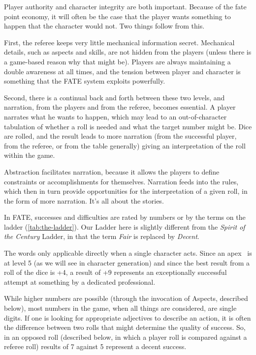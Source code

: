 Player authority and character integrity are both important. Because of the fate point economy, it will often be the case that the player wants something to happen that the character would not. Two things follow from this.

First, the referee keeps very little mechanical information secret. Mechanical details, such as aspects and skills, are not hidden from the players (unless there is a game-based reason why that might be). Players are always maintaining a double awareness at all times, and the tension between player and character is something that the FATE system exploits powerfully.

Second, there is a continual back and forth between these two levels, and narration, from the players and from the referee, becomes essential. A player narrates what he wants to happen, which may lead to an out-of-character tabulation of whether a roll is needed and what the target number might be. Dice are rolled, and the result leads to more narration (from the successful player, from the referee, or from the table generally) giving an interpretation of the roll within the game.

Abstraction facilitates narration, because it allows the players to define constraints or accomplishments for themselves. Narration feeds into the rules, which then in turn provide opportunities for the interpretation of a given roll, in the form of more narration. It's all about the stories.



In FATE, successes and difficulties are rated by numbers or by the terms on the ladder (\autoref{tab:the-ladder}). Our Ladder here is slightly different from the \emph{Spirit of the Century} Ladder, in that the term \emph{Fair} is replaced by \emph{Decent}.

The words only applicable directly when a single character acts. Since an apex \Skill\ is at level 5 (as we will see in character generation) and since the best result from a roll of the dice is +4, a result of +9 represents an exceptionally successful attempt at something by a dedicated professional.

While higher numbers are possible (through the invocation of Aspects, described below), most numbers in the game, when all things are considered, are single digits. If one is looking for appropriate adjectives to describe an action, it is often the difference between two rolls that might determine the quality of success. So, in an opposed roll (described below, in which a player roll is compared against a referee roll) results of 7 against 5 represent a decent success.

\vfil